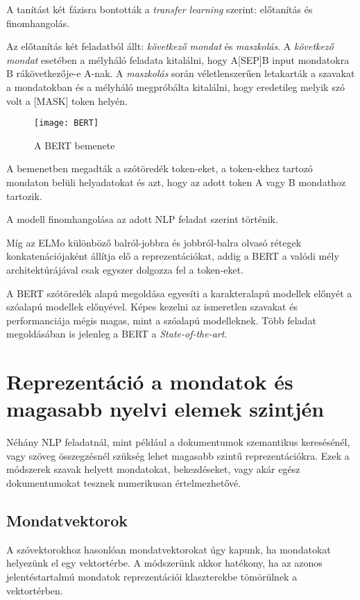 A tanítást két fázisra bontották a \textit{transfer learning} szerint: előtanítás és finomhangolás. 

Az előtanítás két feladatból állt: \textit{következő mondat} és \textit{maszkolás}. A \textit{következő mondat} esetében a mélyháló feladata kitalálni, hogy A[SEP]B input mondatokra B rákövetkezője-e A-nak. A \textit{maszkolás} során véletlenszerűen letakarták a szavakat a mondatokban és a mélyháló megpróbálta kitalálni, hogy eredetileg melyik szó volt a [MASK] token helyén.

\begin{figure}[H]
	\centering
	\texttt{[image: BERT]}
	\caption{A BERT bemenete}
\end{figure}

A bemenetben megadták a szótöredék token-eket, a token-ekhez tartozó mondaton belüli helyadatokat és azt, hogy az adott token A vagy B mondathoz tartozik.

A modell finomhangolása az adott NLP feladat szerint történik.

Míg az ELMo különböző balról-jobbra és jobbról-balra olvasó rétegek konkatenációjaként állítja elő a reprezentációkat, addig a BERT a valódi mély architektúrájával csak egyszer dolgozza fel a token-eket. 

A BERT szótöredék alapú megoldása egyesíti a karakteralapú modellek előnyét a szóalapú modellek előnyével. Képes kezelni az ismeretlen szavakat és performanciája mégis magas, mint a szóalapú modelleknek. Több feladat megoldásában is jelenleg a BERT a \textit{State-of-the-art}.

\section{Reprezentáció a mondatok és magasabb nyelvi elemek szintjén}
Néhány NLP feladatnál, mint például a dokumentumok szemantikus keresésénél, vagy szöveg összegzésnél szükség lehet magasabb szintű reprezentációkra. Ezek a módszerek szavak helyett mondatokat, bekezdéseket, vagy akár egész dokumentumokat tesznek numerikusan értelmezhetővé. 

\subsection{Mondatvektorok}
A szóvektorokhoz hasonlóan mondatvektorokat úgy kapunk, ha mondatokat helyezünk el egy vektortérbe. A módszerünk akkor hatékony, ha az azonos jelentéstartalmú mondatok reprezentációi klaszterekbe tömörülnek a vektortérben.


